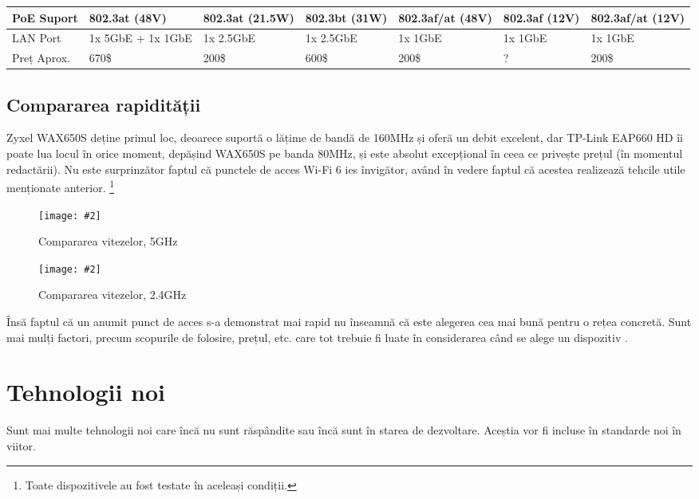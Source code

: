 \documentclass[a4paper,12pt]{report}
\def\oldchapter{} \let\oldchapter=\chapter{}
\def\chapter{\stepcounter{num_chapters}\oldchapter}
\newcommand{\centeredImageWithCaption}[2]{%
  \begin{figure}[H]
    \caption{#1}
    \texttt{[image: \#2]}
    \centering
  \end{figure}}
\begin{document}
\begin{table}[!ht]
\begin{tabular}{|p{}*{6}{|p{0.11\textwidth}}|}
      \hline
      PoE Suport &
      802.3at (48V) &
      802.3at (21.5W) &
      802.3bt (31W) &
      802.3af/at (48V) &
      802.3af (12V) &
      802.3af/at (12V) \\

      \hline
      LAN Port &
      1x 5GbE + 1x 1GbE &
      1x 2.5GbE &
      1x 2.5GbE &
      1x 1GbE &
      1x 1GbE &
      1x 1GbE \\

      \hline
      Preț Aprox. &
      670\$ &
      200\$ &
      600\$ &
      200\$ &
      {?} &
      200\$ \\

      \hline
  \end{tabular}
\end{table}



\section{Compararea rapidității}

\cite{standards_ieee802_11_timeline}

Zyxel WAX650S deține primul loc, deoarece suportă o lățime de bandă de 160MHz și oferă un debit excelent, dar TP-Link E\ac{AP}660 HD îi poate lua locul în orice moment, depășind WAX650S pe banda 80MHz, și este absolut excepțional în ceea ce privește prețul (în momentul redactării).
Nu este surprinzător faptul că punctele de acces \ac{Wi-Fi} 6 ies învigător, având în vedere faptul că acestea realizează tehcile utile menționate anterior. \footnote{Toate dispozitivele au fost testate în aceleași condiții.}

\centeredImageWithCaption{Compararea vitezelor, 5GHz}{best-wireless-access-points-1-re-new.jpg}

\centeredImageWithCaption{Compararea vitezelor, 2.4GHz}{best-wireless-access-points-2-re-new.jpg}


Însă faptul că un anumit punct de acces s-a demonstrat mai rapid nu înseamnă că este alegerea cea mai bună pentru o rețea concretă. Sunt mai mulți factori, precum scopurile de folosire, prețul, etc. care tot trebuie fi luate în considerarea când se alege un dispozitiv \cite{AP_comparison}.


\chapter{Tehnologii noi}

Sunt mai multe tehnologii noi care încă nu sunt răspândite sau încă sunt în starea de dezvoltare.
Aceștia vor fi incluse în standarde noi în viitor.
\end{document}
